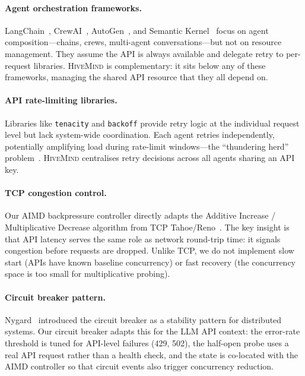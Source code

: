 \documentclass[11pt,twocolumn]{article}
\newcommand{\hm}{\textsc{HiveMind}}
\begin{document}
\paragraph{Agent orchestration frameworks.}
LangChain~\cite{langchain2022}, CrewAI~\cite{crewai2024},
AutoGen~\cite{autogen2023}, and Semantic
Kernel~\cite{semantickernel2023} focus on agent composition---chains,
crews, multi-agent conversations---but not on resource
management.  They assume the API is always available and
delegate retry to per-request libraries.  \hm{} is
complementary: it sits below any of these frameworks, managing
the shared API resource that they all depend on.

\paragraph{API rate-limiting libraries.}
Libraries like \texttt{tenacity} and \texttt{backoff} provide
retry logic at the individual request level but lack system-wide
coordination.  Each agent retries independently, potentially
amplifying load during rate-limit windows---the ``thundering
herd'' problem~\cite{dean2013tail}.  \hm{} centralises retry
decisions across all agents sharing an API key.

\paragraph{TCP congestion control.}
Our AIMD backpressure controller directly adapts the Additive
Increase / Multiplicative Decrease algorithm from TCP
Tahoe/Reno~\cite{jacobson1988congestion,chiu1989aimd,allman2009tcp}.
The key insight is that API latency serves the same role as
network round-trip time: it signals congestion before requests
are dropped.  Unlike TCP, we do not implement slow start
(APIs have known baseline concurrency) or fast recovery
(the concurrency space is too small for multiplicative probing).

\paragraph{Circuit breaker pattern.}
Nygard~\cite{nygard2018release} introduced the circuit breaker
as a stability pattern for distributed systems.  Our circuit
breaker adapts this for the LLM API context: the error-rate
threshold is tuned for API-level failures (429, 502), the
half-open probe uses a real API request rather than a health
check, and the state is co-located with the AIMD controller
so that circuit events also trigger concurrency reduction.
\end{document}
